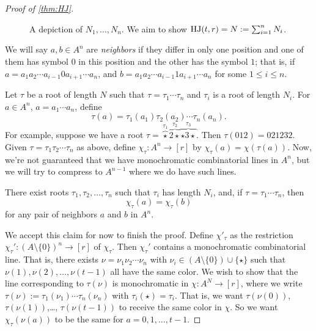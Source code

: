 \begin{proof}[Proof of \cref{thm:HJ}]
\begin{figure}
\begin{center}
\end{center}
\caption{A depiction of $N_1,\dotsc,N_n$. We aim to show $\operatorname{HJ}(t,r) = N:= \sum_{i=1}^n N_i$.} \label{fig:HJ1}
\end{figure}
We will say $a,b\in A^n$ are \emph{neighbors} if they differ in only one position and one of them has symbol $0$ in this position and the other has the symbol $1$; that is, if $a = a_1a_2\dotsm a_{i-1} 0 a_{i+1} \dotsm a_n$, and $b =a_1a_2\dotsm a_{i-1} 1 a_{i+1} \dotsm a_n$ for some $1\leq i \leq n$.

Let $\tau$ be a root of length $N$ such that $\tau = \tau_1\dotsm \tau_n$ and $\tau_i$ is a root of length $N_i$. For $a \in A^n$, $a = a_1\dotsm a_n$, define
\[
\tau(a) = \tau_1(a_1)\tau_2(a_2)\dotsm \tau_n(a_n).
\]
For example, suppose we have a root $\tau=\overbrace{\star}^{\tau_1} \overbrace{2\star}^{\tau_2} \overbrace{\star 3\star}^{\tau_3}$. Then $\tau(012) = 021232$.
Given $\tau = \tau_1\tau_2\dotsm \tau_n$ as above, define $\chi_\tau: A^n \to [r]$ by $\chi_\tau(a) = \chi(\tau(a))$.
Now, we're not guaranteed that we have monochromatic combinatorial lines in $A^n$, but we will try to compress to $A^{n-1}$ where we do have such lines.
\begin{claim}
There exist roots $\tau_1,\tau_2,\dotsc,\tau_n$ such that $\tau_i$ has length $N_i$, and, if $\tau=\tau_1\dotsm \tau_n$, then
\[
\chi_\tau(a) = \chi_\tau(b)
\]
for any pair of neighbors $a$ and $b$ in $A^n$.
\end{claim}
We accept this claim for now to finish the proof. Define $\chi'_\tau$ as the restriction $\chi_\tau': (A\setminus \{0\})^n \to [r]$ of $\chi_\tau$. Then $\chi_\tau'$ contains a monochromatic combinatorial line. That is, there exists $\nu = \nu_1\nu_2\dotsm \nu_n$ with $\nu_i\in (A\setminus\{0\})\cup \{\star\}$ such that $\nu(1),\nu(2),\dotsc,\nu(t-1)$ all have the same color. We wish to show that the line corresponding to $\tau(\nu)$ is monochromatic in $\chi: A^N\to[r]$, where we write $\tau(\nu) := \tau_1(\nu_1)\dotsm \tau_n(\nu_n)$ with $\tau_i(\star)=\tau_i$.
That is, we want $\tau(\nu(0))$, $\tau(\nu(1))$,\ldots, $\tau(\nu(t-1))$ to receive the same color in $\chi$. So we want $\chi_\tau(\nu(a))$ to be the same for $a=0,1,\dotsc,t-1$.


\end{proof}
